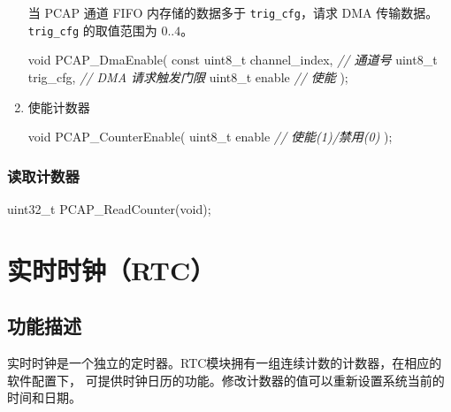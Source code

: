 \documentclass[
  12pt,
]{book}
\newenvironment{Shaded}{\begin{snugshade}}{\end{snugshade}}
\newcommand{\CommentTok}[1]{\textcolor[rgb]{0.56,0.35,0.01}{\textit{#1}}}
\newcommand{\DataTypeTok}[1]{\textcolor[rgb]{0.13,0.29,0.53}{#1}}
\newcommand{\NormalTok}[1]{#1}
\begin{document}
\begin{enumerate}
  当 PCAP 通道 FIFO 内存储的数据多于 \texttt{trig\_cfg}，请求 DMA 传输数据。\texttt{trig\_cfg} 的取值范围为 \(0..4\)。

\begin{Shaded}
\begin{Highlighting}[]
\DataTypeTok{void}\NormalTok{ PCAP_DmaEnable(}
    \DataTypeTok{const} \DataTypeTok{uint8_t}\NormalTok{ channel_index, }\CommentTok{// 通道号}
    \DataTypeTok{uint8_t}\NormalTok{ trig_cfg,            }\CommentTok{// DMA 请求触发门限}
    \DataTypeTok{uint8_t}\NormalTok{ enable               }\CommentTok{// 使能}
\NormalTok{    );}
\end{Highlighting}
\end{Shaded}
\item
  使能计数器

\begin{Shaded}
\begin{Highlighting}[]
\DataTypeTok{void}\NormalTok{ PCAP_CounterEnable(}
    \DataTypeTok{uint8_t}\NormalTok{ enable              }\CommentTok{// 使能(1)/禁用(0)}
\NormalTok{    );}
\end{Highlighting}
\end{Shaded}
\end{enumerate}

\hypertarget{ux8bfbux53d6ux8ba1ux6570ux5668}{%
\subsection{读取计数器}\label{ux8bfbux53d6ux8ba1ux6570ux5668}}

\begin{Shaded}
\begin{Highlighting}[]
\DataTypeTok{uint32_t}\NormalTok{ PCAP_ReadCounter(}\DataTypeTok{void}\NormalTok{);}
\end{Highlighting}
\end{Shaded}

\hypertarget{ch-rtc}{%
\chapter{实时时钟（RTC）}\label{ch-rtc}}

\hypertarget{ux529fux80fdux63cfux8ff0-4}{%
\section{功能描述}\label{ux529fux80fdux63cfux8ff0-4}}

实时时钟是一个独立的定时器。RTC模块拥有一组连续计数的计数器，在相应的软件配置下，
可提供时钟日历的功能。修改计数器的值可以重新设置系统当前的时间和日期。
\end{document}
